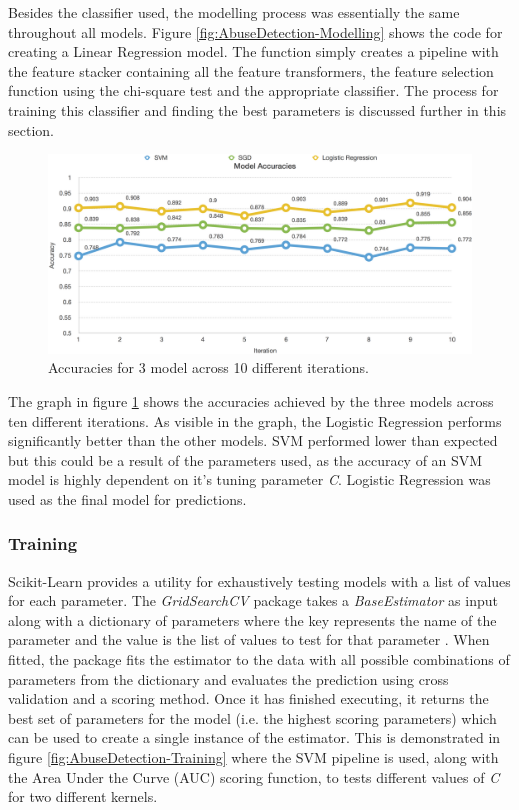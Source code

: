 Besides the classifier used, the modelling process was essentially the same throughout all models. Figure \ref{fig:AbuseDetection-Modelling} shows the code for creating a Linear Regression model. The function simply creates a pipeline with the feature stacker containing all the feature transformers, the feature selection function using the chi-square test and the appropriate classifier. The process for training this classifier and finding the best parameters is discussed further in this section.

\begin{figure}[H]
	\centering
	\includegraphics[width=\textwidth]{Images/Implementation/DataProcessing/AbuseDetection/ModelAccuracies}
	\caption{Accuracies for 3 model across 10 different iterations.}
	\label{fig:AbuseDetection-ModelAccuracies}
\end{figure}

The graph in figure \ref{fig:AbuseDetection-ModelAccuracies} shows the accuracies achieved by the three models across ten different iterations. As visible in the graph, the Logistic Regression performs significantly better than the other models. SVM performed lower than expected but this could be a result of the parameters used, as the accuracy of an SVM model is highly dependent on it's tuning parameter \textit{C}. Logistic Regression was used as the final model for predictions.

\subsubsection{Training}
Scikit-Learn provides a utility for exhaustively testing models with a list of values for each parameter. The \textit{GridSearchCV} package takes a \textit{BaseEstimator} as input along with a dictionary of parameters where the key represents the name of the parameter and the value is the list of values to test for that parameter \cite{Scikit:GridSearch}. When fitted, the package fits the estimator to the data with all possible combinations of parameters from the dictionary and evaluates the prediction using cross validation and a scoring method. Once it has finished executing, it returns the best set of parameters for the model (i.e. the highest scoring parameters) which can be used to create a single instance of the estimator. This is demonstrated in figure \ref{fig:AbuseDetection-Training} where the SVM pipeline is used, along with the Area Under the Curve (AUC) scoring function, to tests different values of \textit{C} for two different kernels.

